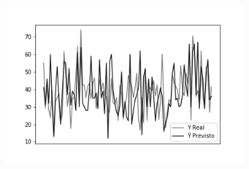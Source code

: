 \begin{figure}[hb!]
\begin{subfigure}[hb]{0.5\linewidth}
    \label{fig:redeneuralbiologica}
    \includegraphics[width=\linewidth]{img/graficos-fase2/fig-reta-dif-lenet-relu-data-augmentation-21.png}%
  \end{subfigure}%
\end{figure}
